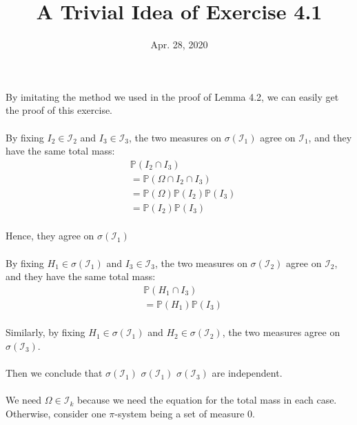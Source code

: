 \documentclass[UTF8]{ctexart}
\theoremstyle{definition}
\begin{document}
\title{A Trivial Idea of Exercise 4.1}
\date{Apr. 28, 2020}

\maketitle
\paragraph{}By imitating the method we used in the proof of Lemma 4.2, we can easily get the proof of this exercise.
\paragraph{}By fixing $I_2\in \mathcal{I}_2$ and $I_3\in \mathcal{I}_3$, the two measures on $\sigma(\mathcal{I}_1)$ agree on $\mathcal{I}_1$, and they have the same total mass:
\begin{align*}
	&\mathbb{P}(I_2\cap I_3) \\&= \mathbb{P}(\Omega\cap I_2\cap I_3)\\ &=\mathbb{P}(\Omega)\mathbb{P}(I_2)\mathbb{P}(I_3)\\&=\mathbb{P}(I_2)\mathbb{P}(I_3)
\end{align*}
\paragraph{}Hence, they agree on $\sigma(\mathcal{I}_1)$
\paragraph{}By fixing $H_1 \in \sigma(\mathcal{I}_1)$ and $I_3 \in \mathcal{I}_3$, the two measures on $\sigma(\mathcal{I}_2)$ agree on $\mathcal{I}_2$, and they have the same total mass:
\begin{align*}
	&\mathbb{P}(H_1\cap I_3) \\&=\mathbb{P}(H_1)\mathbb{P}(I_3)
\end{align*}
\paragraph{}Similarly, by fixing $H_1 \in \sigma(\mathcal{I}_1)$ and $H_2 \in \sigma(\mathcal{I}_2)$, the two measures agree on $\sigma(\mathcal{I}_3)$.
\paragraph{}Then we conclude that $\sigma(\mathcal{I}_1)$ $\sigma(\mathcal{I}_1)$ $\sigma(\mathcal{I}_3)$ are independent.
\\
\paragraph{}We need $\Omega \in \mathcal{I}_k$ because we need the equation for the total mass in each case. Otherwise, consider one $\pi$-system being a set of measure 0.
\end{document}
